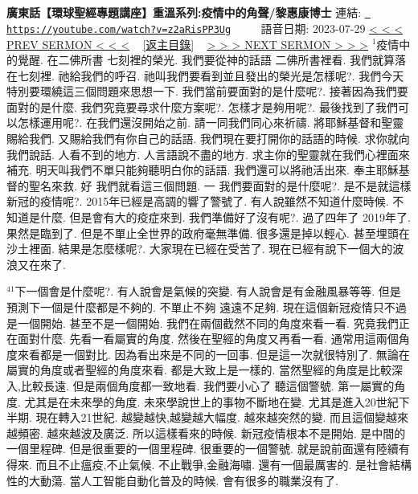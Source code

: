 \documentclass{book}
\begin{document}
\section{}
\label{sec:z2aRisPP3Ug}
\textbf{廣東話【環球聖經專題講座】重溫系列:疫情中的角聲/黎惠康博士}
\newline
\newline
連結: \href{https://youtube.com/watch?v=z2aRisPP3Ug}{\texttt{ https://youtube.com/watch?v=z2aRisPP3Ug}} ~~~~ 語音日期: 2023-07-29 
\newline
\newline
\hyperref[sec:9f0Ts61CPMI]{\small{< < < PREV SERMON < < <}}
~
\hyperref[sec:index]{\small{[返主目錄]}}
~
\hyperref[sec:ok2q_ar3Xrg]{\small{> > > NEXT SERMON > > >}}
\newline
\newline
$^{1}$疫情中的覺醒.
在二佛所書 七刻裡的榮光.
我們要從神的話語 二佛所書裡看.
我們就算落在七刻裡.
祂給我們的呼召.
祂叫我們要看到並且發出的榮光是怎樣呢?.
我們今天特別要環繞這三個問題來思想一下.
我們當前要面對的是什麼呢?.
接著因為我們要面對的是什麼.
我們究竟要尋求什麼方案呢?.
怎樣才是夠用呢?.
最後找到了我們可以怎樣運用呢?.
在我們還沒開始之前.
請一同我們同心來祈禱.
將耶穌基督和聖靈賜給我們.
又賜給我們有你自己的話語.
我們現在要打開你的話語的時候.
求你就向我們說話.
人看不到的地方.
人言語說不盡的地方.
求主你的聖靈就在我們心裡面來補充.
明天叫我們不單只能夠聽明白你的話語.
我們還可以將祂活出來.
奉主耶穌基督的聖名來救.
好 我們就看這三個問題.
一 我們要面對的是什麼呢?.
是不是就這樣新冠的疫情呢?.
2015年已經是高調的響了警號了.
有人說雖然不知道什麼時候.
不知道是什麼.
但是會有大的疫症來到.
我們準備好了沒有呢?.
過了四年了 2019年了.
果然是臨到了.
但是不單止全世界的政府毫無準備.
很多還是掉以輕心.
甚至埋頭在沙土裡面.
結果是怎麼樣呢?.
大家現在已經在受苦了.
現在已經有說下一個大的波浪又在來了.

$^{41}$下一個會是什麼呢?.
有人說會是氣候的突變.
有人說會是有金融風暴等等.
但是預測下一個是什麼都是不夠的.
不單止不夠 遠遠不足夠.
現在這個新冠疫情只不過是一個開始.
甚至不是一個開始.
我們在兩個截然不同的角度來看一看.
究竟我們正在面對什麼.
先看一看屬實的角度.
然後在聖經的角度又再看一看.
通常用這兩個角度來看都是一個對比.
因為看出來是不同的一回事.
但是這一次就很特別了.
無論在屬實的角度或者聖經的角度來看.
都是大致上是一樣的.
當然聖經的角度是比較深入,比較長遠.
但是兩個角度都一致地看.
我們要小心了 聽這個警號.
第一屬實的角度.
尤其是在未來學的角度.
未來學說世上的事物不斷地在變.
尤其是進入20世紀下半期.
現在轉入21世紀.
越變越快,越變越大幅度.
越來越突然的變.
而且這個變越來越頻密.
越來越波及廣泛.
所以這樣看來的時候.
新冠疫情根本不是開始.
是中間的一個里程碑.
但是很重要的一個里程碑.
很重要的一個警號.
就是說前面還有陸續有得來.
而且不止瘟疫,不止氣候.
不止戰爭,金融海嘯.
還有一個最厲害的.
是社會結構性的大動蕩.
當人工智能自動化普及的時候.
會有很多的職業沒有了.
\end{document}
